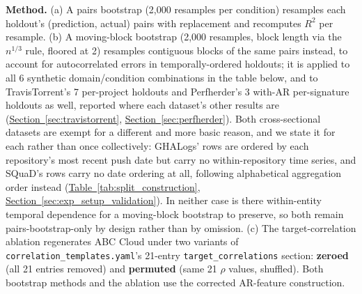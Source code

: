 \documentclass[technologies,article,submit,pdftex,moreauthors]{Definitions/mdpi}
\begin{document}
\textbf{Method.} (a) A pairs bootstrap (2,000 resamples per condition) resamples each holdout's (prediction, actual) pairs with replacement and recomputes \(R^2\) per resample. (b) A moving-block bootstrap (2,000 resamples, block length via the \(n^{1/3}\) rule, floored at 2) resamples contiguous blocks of the same pairs instead, to account for autocorrelated errors in temporally-ordered holdouts; it is applied to all 6 synthetic domain/condition combinations in the table below, and to TravisTorrent's 7 per-project holdouts and Perfherder's 3 with-AR per-signature holdouts as well, reported where each dataset's other results are (\hyperref[sec:travistorrent]{Section~\ref*{sec:travistorrent}}, \hyperref[sec:perfherder]{Section~\ref*{sec:perfherder}}). Both cross-sectional datasets are exempt for a different and more basic reason, and we state it for each rather than once collectively: GHALogs' rows are ordered by each repository's most recent push date but carry no within-repository time series, and SQuaD's rows carry no date ordering at all, following alphabetical aggregation order instead (\hyperref[tab:split_construction]{Table~\ref*{tab:split_construction}}, \hyperref[sec:exp_setup_validation]{Section~\ref*{sec:exp_setup_validation}}). In neither case is there within-entity temporal dependence for a moving-block bootstrap to preserve, so both remain pairs-bootstrap-only by design rather than by omission. (c) The target-correlation ablation regenerates ABC Cloud under two variants of \texttt{correlation\_templates.yaml}'s 21-entry \texttt{target\_correlations} section: \textbf{zeroed} (all 21 entries removed) and \textbf{permuted} (same 21 \(\rho\) values, shuffled). Both bootstrap methods and the ablation use the corrected AR-feature construction.
\end{document}
